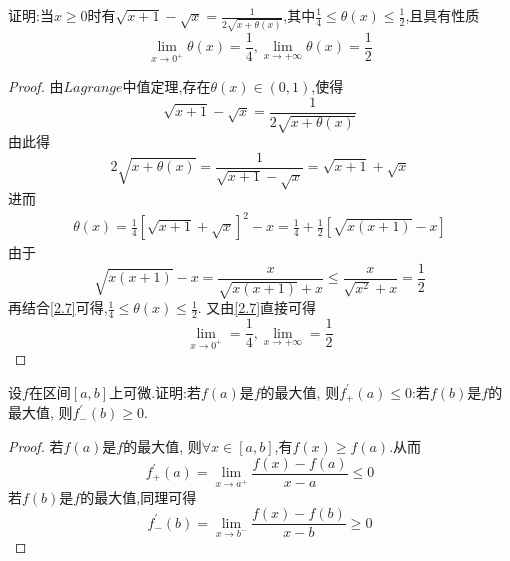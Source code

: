 \documentclass[lang=cn,newtx,10pt,scheme=chinese]{elegantbook}
\begin{document}
\begin{exercise}
证明:当\(x\geq0\)时有\(\sqrt{x+1}-\sqrt{x}=\frac{1}{2\sqrt{x+\theta(x)}}\),其中\(\frac{1}{4}\leq\theta(x)\leq\frac{1}{2}\),且具有性质
\begin{equation}
\lim\limits_{x\to0^{+}}\theta(x)=\frac{1}{4},\lim\limits_{x\to+\infty}\theta(x)=\frac{1}{2}
    \nonumber
\end{equation}

    \begin{proof}
    由$Lagrange$中值定理,存在$\theta(x)\in(0,1)$,使得
    \begin{equation}
    \sqrt{x+1}-\sqrt{x}=\frac{1}{2\sqrt{x+\theta(x)}}
        \nonumber
    \end{equation}
    由此得
    \begin{equation}
    2\sqrt{x+\theta(x)}=\frac{1}{\sqrt{x+1}-\sqrt{x}}=\sqrt{x+1}+\sqrt{x}
        \nonumber
    \end{equation}
    进而
    \begin{equation}\label{2.7}
    \begin{split}
    \theta(x)=\frac{1}{4}[\sqrt{x+1}+\sqrt{x}]^2-x
    =\frac{1}{4}+\frac{1}{2}[\sqrt{x(x+1)}-x]
    \end{split}
    \end{equation}
    由于
    \begin{equation}
    \sqrt{x(x+1)}-x=\frac{x}{\sqrt{x(x+1)}+x}\le \frac{x}{\sqrt{x^2}+x}=\frac{1}{2}
    \nonumber
    \end{equation}
    再结合\eqref{2.7}可得,$\frac{1}{4}\le\theta(x)\le\frac{1}{2}$.
    又由\eqref{2.7}直接可得
    \begin{equation}
    \lim_{x \to 0^{+}} =\frac{1}{4},\lim_{x \to +\infty}=\frac{1}{2}
        \nonumber
    \end{equation}
    \end{proof}
\end{exercise}

\begin{exercise}
    设\(f\)在区间\([a,b]\)上可微.证明:若\(f(a)\)是\(f\)的最大值,
    则\(f^{\prime}_{+}(a)\leq0\):若\(f(b)\)是\(f\)的最大值,
    则\(f^{\prime}_{-}(b)\geq0\).
    \begin{proof}
        若\(f(a)\)是\(f\)的最大值,
        则$\forall x\in[a,b]$,有$f(x) \ge f(a)$.从而
        \begin{equation}
            f_{+}^{\prime}(a)=\lim_{x\rightarrow a^+} \frac{f(x)-f(a)}{x-a}\leqslant 0
            \nonumber
        \end{equation}
        若\(f(b)\)是\(f\)的最大值,同理可得
        \begin{equation}
            f_{-}^{\prime}(b)=\lim_{x\rightarrow b^-} \frac{f(x)-f(b)}{x-b}\geqslant 0
            \nonumber
        \end{equation}
    \end{proof}
\end{exercise}
\end{document}
